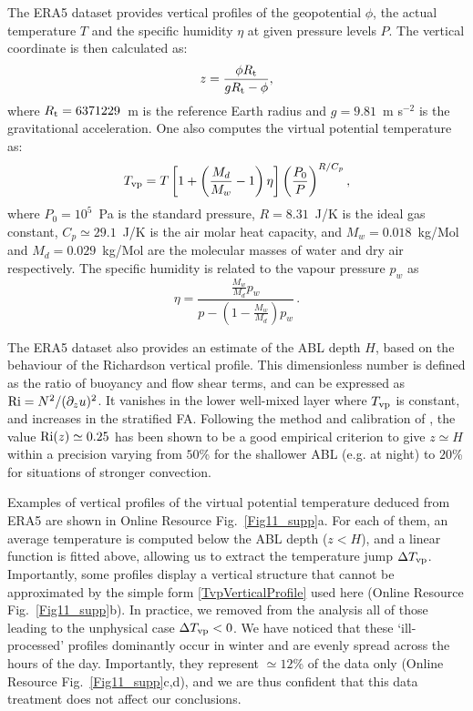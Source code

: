 The ERA5 dataset provides vertical profiles of the geopotential $\phi$, the actual temperature $T$ and the specific humidity $\eta$ at given pressure levels $P$. The vertical coordinate is then calculated as:
%
\begin{equation}
z = \frac{\phi R_{\textup{t}}}{g R_{\textup{t}} - \phi},
\end{equation}
%
where $R_{\textup{t}} = 6371229$~m is the reference Earth radius and $g = 9.81$~m s$^{-2}$ is the gravitational acceleration. One also computes the virtual potential temperature as:
%
\begin{equation}
T_{\textup{vp}} = T\left[1 + \left(\frac{M_d}{M_w} - 1\right) \eta \right] \left(\frac{P_{0}}{P}\right)^{R/C_p},
\end{equation}
%
where $P_{0} = 10^{5}$~Pa is the standard pressure, $R = 8.31$~J/K is the ideal gas constant, $C_p \simeq 29.1$~J/K is the air molar heat capacity, and $M_w = 0.018$~kg/Mol and $M_d = 0.029$~kg/Mol are the molecular masses of water and dry air respectively. The specific humidity is related to the vapour pressure $p_w$ as
%
\begin{equation}
\eta = \frac{\frac{M_w}{M_d} p_w}{p - \left( 1 - \frac{M_w}{M_d} \right) p_w} \, .
\end{equation}
%

The ERA5 dataset also provides an estimate of the ABL depth $H$, based on the behaviour of the Richardson vertical profile. This dimensionless number is defined as the ratio of buoyancy and flow shear terms, and can be expressed as $\textup{Ri} = N^2/(\partial_z u)^2$. It vanishes in the lower well-mixed layer where $T_{\textup{vp}}$ is constant, and increases in the stratified FA. Following the method and calibration of \citet{Vogelezang1996,seidel2012}, the value $\textup{Ri}(z) \simeq 0.25$ has been shown to be a good empirical criterion to give $z \simeq H$ within a precision varying from $50$\% for the shallower ABL (e.g. at night) to $20$\% for situations of stronger convection.

Examples of vertical profiles of the virtual potential temperature deduced from ERA5 are shown in Online Resource Fig.~\ref{Fig11_supp}a. For each of them, an average temperature is computed below the ABL depth ($z<H$), and a linear function is fitted above, allowing us to extract the temperature jump $\Delta T_{\textup{vp}}$. Importantly, some profiles display a vertical structure that cannot be approximated by the simple form \eqref{TvpVerticalProfile} used here (Online Resource Fig.~\ref{Fig11_supp}b). In practice, we removed from the analysis all of those leading to the unphysical case $\Delta T_{\textup{vp}}<0$. We have noticed that these `ill-processed' profiles dominantly occur in winter and are evenly spread across the hours of the day. Importantly, they represent $\simeq12$\% of the data only (Online Resource Fig.~\ref{Fig11_supp}c,d), and we are thus confident that this data treatment does not affect our conclusions.

